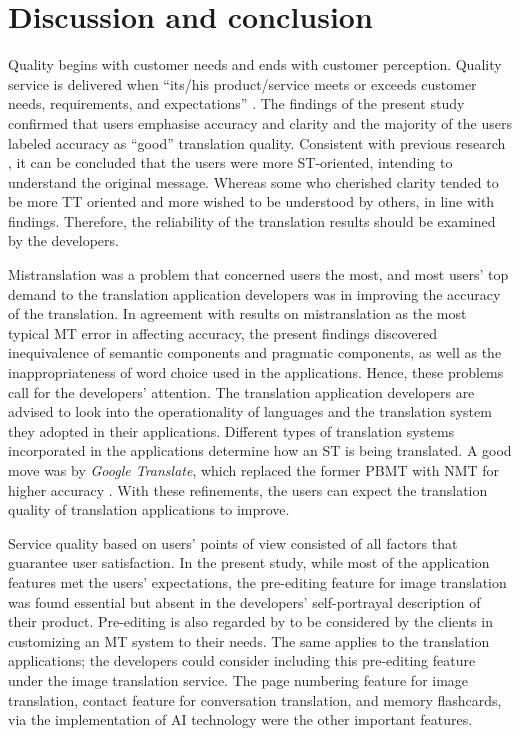 \documentclass[english]{textolivre}
\begin{document}
\section{Discussion and conclusion}\label{sec-conclusao}
Quality begins with customer needs and ends with customer perception. Quality service is delivered when “its/his product/service meets or exceeds customer needs, requirements, and expectations” \cite{kotler_principles_1994}. The findings of the present study confirmed that users emphasise accuracy and clarity and the majority of the users labeled accuracy as “good” translation quality. Consistent with previous research \cite{barnwell_introduction_1980,nababan_teori_2008}, it can be concluded that the users were more ST-oriented, intending to understand the original message. Whereas some who cherished clarity tended to be more TT oriented and more wished to be understood by others, in line with \textcite{chesterman_memes_2000} findings. Therefore, the reliability of the translation results should be examined by the developers.

Mistranslation was a problem that concerned users the most, and most users’ top demand to the translation application developers was in improving the accuracy of the translation. In agreement with \textcite{koponen_assessing_2010} results on mistranslation as the most typical MT error in affecting accuracy, the present findings discovered inequivalence of semantic components and pragmatic components, as well as the inappropriateness of word choice used in the applications. Hence, these problems call for the developers’ attention. The translation application developers are advised to look into the operationality of languages and the translation system they adopted in their applications. Different types of translation systems incorporated in the applications determine how an ST is being translated. A good move was by \textit{Google Translate}, which replaced the former PBMT with NMT for higher accuracy \cite{jean_does_2017}. With these refinements, the users can expect the translation quality of translation applications to improve.

Service quality based on users’ points of view consisted of all factors that guarantee user satisfaction. In the present study, while most of the application features met the users’ expectations, the pre-editing feature for image translation was found essential but absent in the developers’ self-portrayal description of their product. Pre-editing is also regarded by \textcite{ryan_machine_1993} to be considered by the clients in customizing an MT system to their needs. The same applies to the translation applications; the developers could consider including this pre-editing feature under the image translation service. The page numbering feature for image translation, contact feature for conversation translation, and memory flashcards, via the implementation of AI technology were the other important features.
\end{document}

